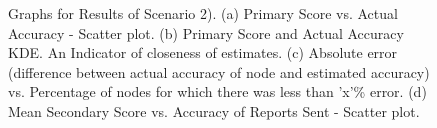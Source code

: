 \documentclass[journal]{IEEEtran}
\begin{document}
\begin{figure}[!ht]
	\caption{Graphs for Results of Scenario 2). (a) Primary Score vs. Actual Accuracy - Scatter plot. (b) Primary Score and Actual Accuracy KDE. An Indicator of closeness of estimates. (c) Absolute error (difference between actual accuracy of node and estimated accuracy) vs. Percentage of nodes for which there was less than 'x'\% error. (d) Mean Secondary Score vs. Accuracy of Reports Sent - Scatter plot.}
	\label{fig:apdx:sc2}
	\centering
	\hfill
\end{figure}
\end{document}
